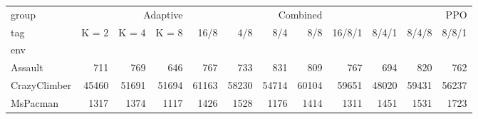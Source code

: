 \begin{tabular}{lrrrrrrrrrrr}
\toprule
group & \multicolumn{3}{r}{Adaptive} & \multicolumn{4}{r}{Combined} & \multicolumn{4}{r}{PPO} \\
tag & K = 2 & K = 4 & K = 8 & 16/8 & 4/8 & 8/4 & 8/8 & 16/8/1 & 8/4/1 & 8/4/8 & 8/8/1 \\
env &  &  &  &  &  &  &  &  &  &  &  \\
\midrule
Assault & 711 & 769 & 646 & 767 & 733 & 831 & 809 & 767 & 694 & 820 & 762 \\
CrazyClimber & 45460 & 51691 & 51694 & 61163 & 58230 & 54714 & 60104 & 59651 & 48020 & 59431 & 56237 \\
MsPacman & 1317 & 1374 & 1117 & 1426 & 1528 & 1176 & 1414 & 1311 & 1451 & 1531 & 1723 \\
\bottomrule
\end{tabular}
